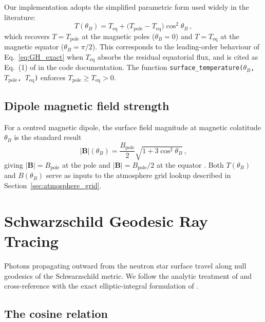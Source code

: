 Our implementation adopts the simplified parametric form used widely in the
literature:
\begin{equation}
  \boxed{T(\theta_B) = T_{\mathrm{eq}}
    + \bigl(T_{\mathrm{pole}} - T_{\mathrm{eq}}\bigr)\cos^{2}\!\theta_B\,,}
  \label{eq:T_surface}
\end{equation}
which recovers $T = T_{\mathrm{pole}}$ at the magnetic poles
($\theta_B = 0$) and $T = T_{\mathrm{eq}}$ at the magnetic equator
($\theta_B = \pi/2$).  This corresponds to the leading-order behaviour of
Eq.~\eqref{eq:GH_exact} when $T_{\mathrm{eq}}$ absorbs the residual
equatorial flux, and is cited as Eq.~(1) of \citet{greenstein_hartke_1983}
in the code documentation.  The function
\texttt{surface\_temperature($\theta_B$, $T_{\mathrm{pole}}$, $T_{\mathrm{eq}}$)}
enforces $T_{\mathrm{pole}} \geq T_{\mathrm{eq}} > 0$.

\subsection{Dipole magnetic field strength}

For a centred magnetic dipole, the surface field magnitude at magnetic
colatitude $\theta_B$ is the standard result
\begin{equation}
  \lvert\boldsymbol{B}\rvert(\theta_B)
    = \frac{B_{\mathrm{pole}}}{2}
      \sqrt{1 + 3\cos^{2}\!\theta_B}\,,
  \label{eq:B_dipole}
\end{equation}
giving $\lvert\boldsymbol{B}\rvert = B_{\mathrm{pole}}$ at the pole and
$\lvert\boldsymbol{B}\rvert = B_{\mathrm{pole}}/2$ at the equator
\citep{greenstein_hartke_1983}.  Both $T(\theta_B)$ and
$B(\theta_B)$ serve as inputs to the atmosphere grid lookup described in
Section~\ref{sec:atmosphere_grid}.


\section{Schwarzschild Geodesic Ray Tracing}
\label{sec:ray_tracing}

Photons propagating outward from the neutron star surface travel along null
geodesics of the Schwarzschild metric.  We follow the analytic treatment of
\citet{beloborodov_2002} and cross-reference with the exact elliptic-integral
formulation of \citet{pechenick_1983}.

\subsection{The cosine relation}


